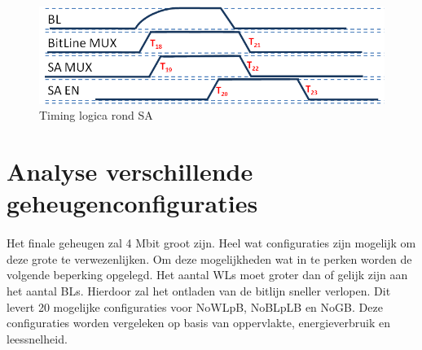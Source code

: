 \begin{figure}[!ht]
  \centering
  \includegraphics[scale=0.9]{../fig/hfdstk-timing-sa2.png}
  \caption[SA:timing]{Timing logica rond SA}
  \label{fig:sa_timing2}
\end{figure}

\section{Analyse verschillende geheugenconfiguraties}
\paragraph{}
Het finale geheugen zal 4 Mbit groot zijn. Heel wat configuraties zijn mogelijk om deze grote te verwezenlijken. Om deze mogelijkheden wat in te perken worden de volgende beperking opgelegd. Het aantal WLs moet groter dan of gelijk zijn aan het aantal BLs. Hierdoor zal het ontladen van de bitlijn sneller verlopen. Dit levert 20 mogelijke configuraties voor NoWLpB, NoBLpLB en NoGB. Deze configuraties worden vergeleken op basis van oppervlakte, energieverbruik en leessnelheid. 

